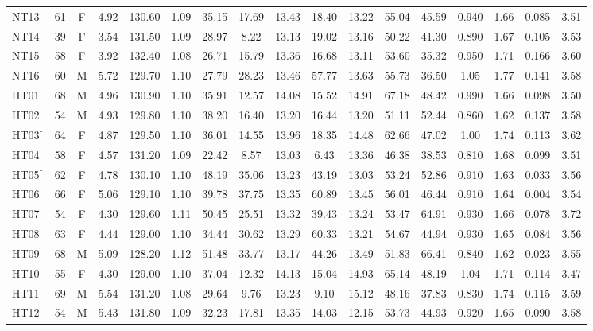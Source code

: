 \begin{table}[H]
{\begin{tabular}{lcccccccccccccccc}
NT13 & 61 & F & 4.92 & 130.60 & 1.09 & 35.15 & 17.69 & 13.43 & 18.40 & 13.22 & 55.04 & 45.59 & 0.940 & 1.66 & 0.085 & 3.51\\
NT14 & 39 & F & 3.54 & 131.50 & 1.09 & 28.97 & 8.22 & 13.13 & 19.02 & 13.16 & 50.22 & 41.30 & 0.890 & 1.67 & 0.105 & 3.53\\
NT15 & 58 & F & 3.92 & 132.40 & 1.08 & 26.71 & 15.79 & 13.36 & 16.68 & 13.11 & 53.60 & 35.32 & 0.950 & 1.71 & 0.166 & 3.60\\
NT16 & 60 & M & 5.72 & 129.70 & 1.10 & 27.79 & 28.23 & 13.46 & 57.77 & 13.63 & 55.73 & 36.50 & 1.05 & 1.77 & 0.141 & 3.58\\
HT01 & 68 & M & 4.96 & 130.90 & 1.10 & 35.91 & 12.57 & 14.08 & 15.52 & 14.91 & 67.18 & 48.42 & 0.990 & 1.66 & 0.098 & 3.50\\
HT02 & 54 & M & 4.93 & 129.80 & 1.10 & 38.20 & 16.40 & 13.20 & 16.44 & 13.20 & 51.11 & 52.44 & 0.860 & 1.62 & 0.137 & 3.58\\
HT03$^\dagger$ & 64 & F & 4.87 & 129.50 & 1.10 & 36.01 & 14.55 & 13.96 & 18.35 & 14.48 & 62.66 & 47.02 & 1.00 & 1.74 & 0.113 & 3.62\\
HT04 & 58 & F & 4.57 & 131.20 & 1.09 & 22.42 & 8.57 & 13.03 & 6.43 & 13.36 & 46.38 & 38.53 & 0.810 & 1.68 & 0.099 & 3.51\\
HT05$^\dagger$ & 62 & F & 4.78 & 130.10 & 1.10 & 48.19 & 35.06 & 13.23 & 43.19 & 13.03 & 53.24 & 52.86 & 0.910 & 1.63 & 0.033 & 3.56\\
HT06 & 66 & F & 5.06 & 129.10 & 1.10 & 39.78 & 37.75 & 13.35 & 60.89 & 13.45 & 56.01 & 46.44 & 0.910 & 1.64 & 0.004 & 3.54\\
HT07 & 54 & F & 4.30 & 129.60 & 1.11 & 50.45 & 25.51 & 13.32 & 39.43 & 13.24 & 53.47 & 64.91 & 0.930 & 1.66 & 0.078 & 3.72\\
HT08 & 63 & F & 4.44 & 129.00 & 1.10 & 34.44 & 30.62 & 13.29 & 60.33 & 13.21 & 54.67 & 44.94 & 0.930 & 1.65 & 0.084 & 3.56\\
HT09 & 68 & M & 5.09 & 128.20 & 1.12 & 51.48 & 33.77 & 13.17 & 44.26 & 13.49 & 51.83 & 66.41 & 0.840 & 1.62 & 0.023 & 3.55\\
HT10 & 55 & F & 4.30 & 129.00 & 1.10 & 37.04 & 12.32 & 14.13 & 15.04 & 14.93 & 65.14 & 48.19 & 1.04 & 1.71 & 0.114 & 3.47\\
HT11 & 69 & M & 5.54 & 131.20 & 1.08 & 29.64 & 9.76 & 13.23 & 9.10 & 15.12 & 48.16 & 37.83 & 0.830 & 1.74 & 0.115 & 3.59\\
HT12 & 54 & M & 5.43 & 131.80 & 1.09 & 32.23 & 17.81 & 13.35 & 14.03 & 12.15 & 53.73 & 44.93 & 0.920 & 1.65 & 0.090 & 3.58\\

\end{tabular}}
\end{table}

